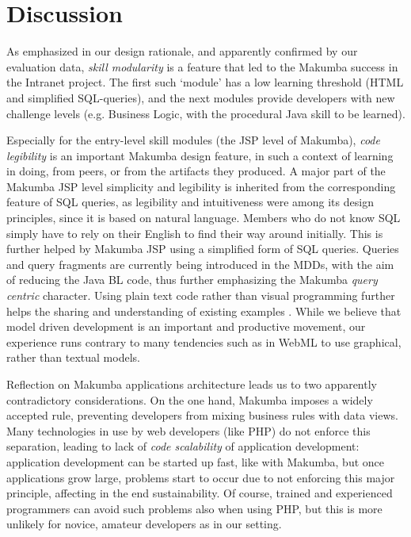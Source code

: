 \documentclass{chi2009}
\begin{document}
\section{Discussion}\label{sec:disco}
As emphasized in our design rationale, and apparently confirmed by our evaluation data, \textit{skill modularity} is a feature that led to the Makumba success in the Intranet project. The first such `module' has a low learning threshold (HTML and simplified SQL-queries), and the next modules provide developers with new challenge levels (e.g. Business Logic, with the procedural Java skill to be learned).

Especially for the entry-level skill modules (the JSP level of Makumba), \textit{code legibility} is an important Makumba design feature, in such a context of learning in doing, from peers, or from the artifacts they produced. 
A major part of the Makumba JSP level simplicity and legibility is inherited from the corresponding feature of SQL queries, as legibility and intuitiveness were among its design principles, since it is based on natural language. Members who do not know SQL simply have to rely on their English to find their way around initially. This is further helped by Makumba JSP using a simplified form of SQL queries. Queries and query fragments are currently being introduced in the MDDs, with the aim of reducing the Java BL code, thus further emphasizing the Makumba \textit{query centric} character. Using plain text code rather than visual programming further helps the sharing and understanding of existing examples \cite{yamauchi00}. While we believe that model driven development is an important and productive movement, our experience runs contrary to many tendencies such as in WebML \cite{Ceri00webmodeling} to use graphical, rather than textual models.

Reflection on Makumba applications architecture leads us to two apparently contradictory considerations. On the one hand, Makumba imposes a widely accepted rule, preventing developers from mixing business rules with data views. Many technologies in use by web developers (like PHP) do not enforce this separation, leading to lack of \textit{code scalability} of application development: application development can be started up fast, like with Makumba, but once applications grow large, problems start to occur due to not enforcing this major principle, affecting in the end sustainability. Of course, trained and experienced programmers can avoid such problems also when using PHP, but this is more unlikely for novice, amateur developers as in our setting.
\end{document}
